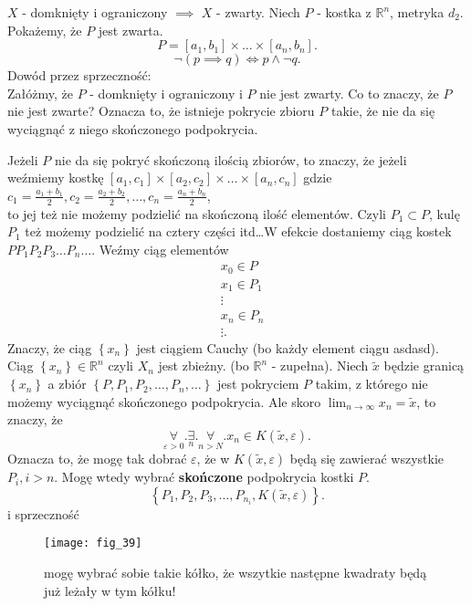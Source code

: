 \documentclass[../main.tex]{subfiles}
\begin{document}
\begin{dowod}
     $X$ - domknięty i ograniczony $\implies$ $X$ - zwarty. Niech $P$ - kostka z $\mathbb{R}^n$, metryka $d_2$. Pokażemy, że $P$ jest zwarta.
    \[
        P = [a_1,b_1]\times\ldots\times[a_n,b_n]
    .\]
    \[
        \lnot(p\implies q)\iff p\land \lnot q
    .\]
    Dowód przez sprzeczność:\\
    Załóżmy, że $P$ - domknięty i ograniczony i $P$ nie jest zwarty. Co to znaczy, że $P$ nie jest zwarte? Oznacza to, że istnieje pokrycie zbioru $P$ takie, że nie da się wyciągnąć z niego skończonego podpokrycia.

    Jeżeli $P$ nie da się pokryć skończoną ilością zbiorów, to znaczy, że jeżeli weźmiemy kostkę $[a_1,c_1]\times[a_2,c_2]\times\ldots\times[a_n,c_n]$ gdzie $c_1 = \frac{a_1+b_1}{2}, c_2 = \frac{a_2+b_2}{2}, \ldots, c_n = \frac{a_n+b_n}{2}$,\\
    to jej też nie możemy podzielić na skończoną ilość elementów. Czyli $P_1\subset P$, kulę $P_1$ też możemy podzielić na cztery części itd\ldots W efekcie dostaniemy ciąg kostek $P P_1 P_2 P_3 \ldots P_n \ldots$.
    Weźmy ciąg elementów
    \begin{align*}
        &x_0\in P\\
        &x_1\in P_1\\
        &\vdots\\
        &x_n\in P_n\\
        &\vdots
    .\end{align*}
    Znaczy, że ciąg $\left\{ x_n \right\}$ jest ciągiem Cauchy (bo każdy element ciągu asdasd). Ciąg $\left\{ x_n \right\} \in\mathbb{R}^n$ czyli $X_n$ jest zbieżny.
    (bo $\mathbb{R}^n$ - zupełna). Niech $\tilde x$ będzie granicą $\left\{ x_n \right\} $ a zbiór $\left\{ P,P_1,P_2,\ldots,P_n,\ldots \right\} $ jest pokryciem $P$ takim, z którego nie możemy wyciągnąć skończonego podpokrycia. Ale skoro $\lim_{n\to\infty}x_n = \tilde x$, to znaczy, że
    \[
        \underset{\varepsilon>0}{\forall} . \underset{n}{\exists} . \underset{n>N}{\forall} . x_n\in K(\tilde x,\varepsilon)
    .\]
    Oznacza to, że mogę tak dobrać $\varepsilon$, że w $K(\tilde x,\varepsilon)$ będą się zawierać wszystkie $P_{i}, i>n$. Mogę wtedy wybrać \textbf{skończone} podpokrycia kostki $P$.\\
    \[
        \left\{ P_1,P_2,P_3,\ldots,P_{n_i}, K(\tilde x,\varepsilon) \right\}
    .\] i sprzeczność
    \begin{figure}[h]
        \centering
        \texttt{[image: fig\_39]}
        \caption{mogę wybrać sobie takie kółko, że wszytkie następne kwadraty będą już leżały w tym kółku!}
    \end{figure}
    \end{dowod}
\end{document}
